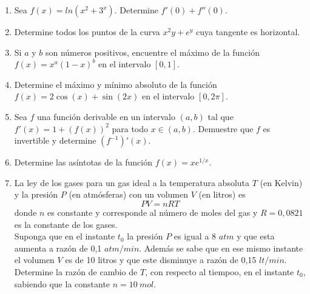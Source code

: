 \documentclass[12pt]{article}
\newenvironment{preguntas}
{\begin{enumerate}\itemsep12pt
	}
	{
	\end{enumerate}
}
\begin{document}
\begin{preguntas}
\item Sea $f(x) = ln(x^2+3^x)$. Determine $f'(0) + f''(0)$.
\item Determine todos los puntos de la curva $x^2y + e^y$ cuya tangente es horizontal.
\item Si $a$ y $b$ son números positivos, encuentre el máximo de la función $f(x) = x^a(1-x)^b$ en el intervalo $[0,1]$.
\item Determine el máximo y mínimo absoluto de la función $f(x) = 2\cos (x) + \sin (2x)$ en el intervalo $[0, 2\pi]$.
\item Sea $f$ una función derivable en un intervalo $(a,b)$ tal que $f'(x) = 1+(f(x))^2$ para todo $x \in (a,b)$. Demuestre que $f$ es invertible y determine $(f^{-1})'(x)$.
\item Determine las asíntotas de la función $f(x) = xe^{1/x}$.
\item La ley de los gases para un gas ideal a la temperatura absoluta $T$ (en Kelvin) y la presión $P$ (en atmósferas) con un volumen $V$ (en litros) es
$$PV = nRT$$
donde $n$ es constante y corresponde al número de moles del gas y $R = 0,0821$ es la constante de los gases.\\
Suponga que en el instante $t_0$ la presión $P$ es igual a 8 $atm$ y que esta aumenta a razón de 0,1 $atm/min$. Además se sabe que en ese mismo instante el volumen $V$ es de 10 litros y que este disminuye a razón de 0,15 $lt/min$.\\
Determine la razón de cambio de $T$, con respecto al tiempoo, en el instante $t_0$, sabiendo que la constante $n = 10\ mol$.
\end{preguntas}
\end{document}
